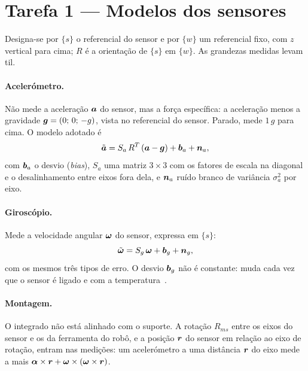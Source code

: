 \section{Tarefa 1 --- Modelos dos sensores}
\label{sec:modelos}

Designa-se por $\{s\}$ o referencial do sensor e por $\{w\}$ um referencial
fixo, com $z$ vertical para cima; $R$ é a orientação de $\{s\}$ em $\{w\}$.
As grandezas medidas levam til.

\paragraph{Acelerómetro.} Não mede a aceleração $\boldsymbol{a}$ do sensor, mas a
força específica: a aceleração menos a gravidade
$\boldsymbol{g} = (0;\,0;\,-g)$, vista no referencial do sensor. Parado, mede $1\,g$
para cima. O modelo adotado é
\begin{equation}
\tilde{\boldsymbol{a}} = S_a\,R^{T}\,(\boldsymbol{a} - \boldsymbol{g}) + \boldsymbol{b}_a + \boldsymbol{n}_a ,
\label{eq:acc}
\end{equation}
com $\boldsymbol{b}_a$ o desvio (\emph{bias}), $S_a$ uma matriz $3\times3$ com os
fatores de escala na diagonal e o desalinhamento entre eixos fora dela, e
$\boldsymbol{n}_a$ ruído branco de variância $\sigma_a^2$ por eixo.

\paragraph{Giroscópio.} Mede a velocidade angular $\boldsymbol{\omega}$ do sensor,
expressa em $\{s\}$:
\begin{equation}
\tilde{\boldsymbol{\omega}} = S_g\,\boldsymbol{\omega} + \boldsymbol{b}_g + \boldsymbol{n}_g ,
\label{eq:gyro}
\end{equation}
com os mesmos três tipos de erro. O desvio $\boldsymbol{b}_g$ não é constante: muda
cada vez que o sensor é ligado e com a temperatura~\cite{titterton2004}.

\paragraph{Montagem.} O integrado não está alinhado com o suporte. A rotação
$R_{ms}$ entre os eixos do sensor e os da ferramenta do robô, e a posição
$\boldsymbol{r}$ do sensor em relação ao eixo de rotação, entram nas medições: um
acelerómetro a uma distância $\boldsymbol{r}$ do eixo mede a mais
$\boldsymbol{\alpha}\times\boldsymbol{r} + \boldsymbol{\omega}\times(\boldsymbol{\omega}\times\boldsymbol{r})$.

